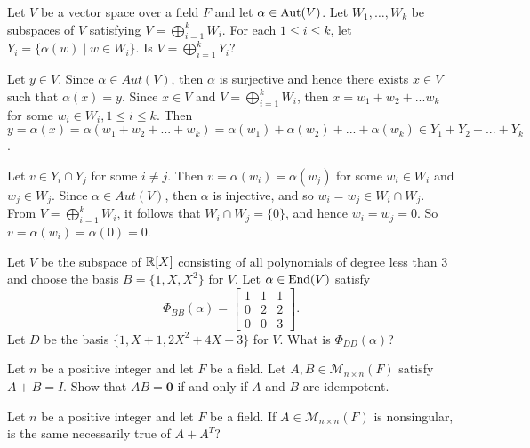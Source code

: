 \begin{problem}[Golan 354]
Let $V$ be a vector space over a field $F$ and let $\alpha \in \operatorname{Aut}(V)$.  Let
$W_1, \dots, W_k$ be subspaces of $V$ satisfying $V = \bigoplus_{i=1}^k W_i$.
For each $1\leq i \leq k$, let $Y_i = \{\alpha(w) \mid w \in W_i\}$.
Is $V = \bigoplus_{i=1}^k Y_i$?
\end{problem}
\smallskip
\begin{solution}

Let $y \in V$. Since $\alpha \in Aut(V)$, then $\alpha$ is surjective and hence 
there exists $x \in V$ such that $\alpha(x)=y$. Since $x \in V$ and 
$V = \bigoplus_{i=1}^k W_i$, then $x=w_1+w_2+...w_k$ for some $w_i \in W_i, 1 \le i \le k$. 
Then $y=\alpha(x)=\alpha(w_1+w_2+...+w_k)=\alpha(w_1)+\alpha(w_2)+...+\alpha(w_k) \in Y_1 + Y_2 + ... + Y_k$.

\smallskip

Let $v \in Y_i \cap Y_j$ for some $i \ne j$. Then $v=\alpha(w_i)=\alpha(w_j)$ 
for some $w_i \in W_i$ and $w_j \in W_j$. Since $\alpha \in Aut(V)$, then $\alpha$ 
is injective, and so $w_i=w_j \in W_i \cap W_j$. From $V = \bigoplus_{i=1}^k W_i$, 
it follows that $W_i \cap W_j = \{0\}$, and hence $w_i=w_j=0$. So $v=\alpha(w_i)=\alpha(0)=0$.

\end{solution}

\begin{ex}[Golan 415]
Let $V$ be the subspace of $\mathbb{R}[X]$ consisting of all polynomials of degree less
than 3 and choose the basis $B = \{1, X, X^2\}$ for $V$. Let $\alpha \in \operatorname{End}(V)$ satisfy
\[
\Phi_{BB}(\alpha) = 
\begin{bmatrix} 
1 & 1 & 1\\ 
0 & 2 & 2\\
0 & 0 & 3
\end{bmatrix}.
\]
Let $D$ be the basis $\{1, X+1, 2X^2 + 4X + 3\}$ for $V$.  What is $\Phi_{DD}(\alpha)$?
\end{ex}

\probskip

\begin{ex}[Golan 467]
Let $n$ be a positive integer and let $F$ be a field.  Let 
$A, B\in \mathcal{M}_{n\times n}(F)$ satisfy $A + B = I$.  Show that $AB = \mathbf{0}$
if and only if $A$ and $B$ are idempotent.
\end{ex}

\probskip

\begin{ex}[Golan 530]
Let $n$ be a positive integer and let $F$ be a field.  If
$A \in \mathcal{M}_{n\times n}(F)$ is nonsingular, is the same necessarily true
of $A + A^T$?
\end{ex}

%
%


